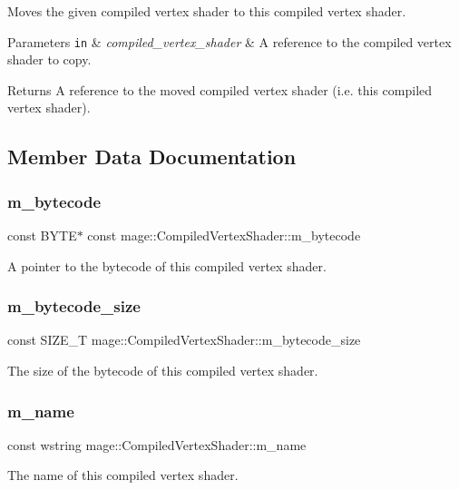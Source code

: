 Moves the given compiled vertex shader to this compiled vertex shader.


\begin{DoxyParams}[1]{Parameters}
\mbox{\tt in}  & {\em compiled\+\_\+vertex\+\_\+shader} & A reference to the compiled vertex shader to copy. \\
\hline
\end{DoxyParams}
\begin{DoxyReturn}{Returns}
A reference to the moved compiled vertex shader (i.\+e. this compiled vertex shader). 
\end{DoxyReturn}


\subsection{Member Data Documentation}
\hypertarget{structmage_1_1_compiled_vertex_shader_ab416def2b374a9c55475e717dd6df540}{}\label{structmage_1_1_compiled_vertex_shader_ab416def2b374a9c55475e717dd6df540} 
\subsubsection{\texorpdfstring{m\+\_\+bytecode}{m\_bytecode}}
{\footnotesize\ttfamily const B\+Y\+TE$\ast$ const mage\+::\+Compiled\+Vertex\+Shader\+::m\+\_\+bytecode}

A pointer to the bytecode of this compiled vertex shader. \hypertarget{structmage_1_1_compiled_vertex_shader_aab5b4dc130cef9a34e4ceaff22ba3a14}{}\label{structmage_1_1_compiled_vertex_shader_aab5b4dc130cef9a34e4ceaff22ba3a14} 
\subsubsection{\texorpdfstring{m\+\_\+bytecode\+\_\+size}{m\_bytecode\_size}}
{\footnotesize\ttfamily const S\+I\+Z\+E\+\_\+T mage\+::\+Compiled\+Vertex\+Shader\+::m\+\_\+bytecode\+\_\+size}

The size of the bytecode of this compiled vertex shader. \hypertarget{structmage_1_1_compiled_vertex_shader_af37c5f63c4146dd796c7e4df5ade4d0e}{}\label{structmage_1_1_compiled_vertex_shader_af37c5f63c4146dd796c7e4df5ade4d0e} 
\subsubsection{\texorpdfstring{m\+\_\+name}{m\_name}}
{\footnotesize\ttfamily const wstring mage\+::\+Compiled\+Vertex\+Shader\+::m\+\_\+name}

The name of this compiled vertex shader. 